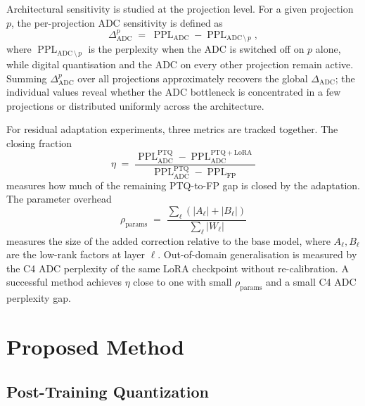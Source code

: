 \documentclass[a4paper,11pt,oneside]{article}
\theoremstyle{breakstyle}
\begin{document}
Architectural sensitivity is studied at the projection level. For a given projection $p$, the per-projection ADC sensitivity is defined as
\begin{equation}
    \Delta^p_{\mathrm{ADC}}
    \;=\;
    \operatorname{PPL}_{\mathrm{ADC}}
    -
    \operatorname{PPL}_{\mathrm{ADC}\,\setminus\,p},
    \label{eq:per_proj_sensitivity}
\end{equation}
where \(\operatorname{PPL}_{\mathrm{ADC}\,\setminus\,p}\) is the perplexity when the ADC is switched off on \(p\) alone, while digital quantisation and the ADC on every other projection remain active. Summing \(\Delta^p_{\mathrm{ADC}}\) over all projections approximately recovers the global \(\Delta_{\mathrm{ADC}}\); the individual values reveal whether the ADC bottleneck is concentrated in a few projections or distributed uniformly across the architecture.

For residual adaptation experiments, three metrics are tracked together. The closing fraction
\begin{equation}
    \eta
    \;=\;
    \frac{
        \operatorname{PPL}^{\mathrm{PTQ}}_{\mathrm{ADC}}
        -
        \operatorname{PPL}^{\mathrm{PTQ{+}LoRA}}_{\mathrm{ADC}}
    }{
        \operatorname{PPL}^{\mathrm{PTQ}}_{\mathrm{ADC}}
        -
        \operatorname{PPL}_{\mathrm{FP}}
    }
    \label{eq:closing_fraction}
\end{equation}
measures how much of the remaining PTQ-to-FP gap is closed by the adaptation. The parameter overhead
\begin{equation}
    \rho_{\mathrm{params}}
    \;=\;
    \frac{
        \sum_\ell (|A_\ell| + |B_\ell|)
    }{
        \sum_\ell |W_\ell|
    }
    \label{eq:param_overhead}
\end{equation}
measures the size of the added correction relative to the base model, where \(A_\ell, B_\ell\) are the low-rank factors at layer \(\ell\). Out-of-domain generalisation is measured by the C4 ADC perplexity of the same LoRA checkpoint without re-calibration. A successful method achieves \(\eta\) close to one with small \(\rho_{\mathrm{params}}\) and a small C4 ADC perplexity gap.


  \section{Proposed Method}\label{sec:method}

  \subsection{Post-Training Quantization}
\end{document}

